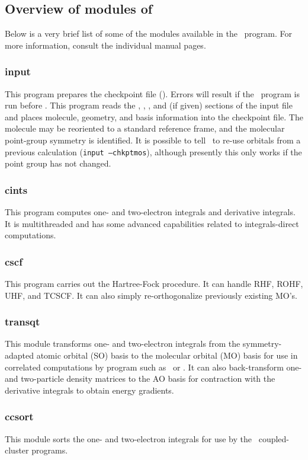 \subsection{Overview of modules of \PSIthree}
Below is a very brief list of some of the modules available in the
\PSIthree\ program.  For more information, consult the individual
manual pages.
\subsubsection{input}
This program prepares the checkpoint file (\chkptfile).  Errors will
result if the \PSIpsi\ program is run before \PSIinput.  This program
reads the , , , and (if given)
 sections of the input file and places molecule,
geometry, and basis information into the checkpoint file.  The
molecule may be reoriented to a standard reference frame, and the
molecular point-group symmetry is identified.  It is possible to tell
\PSIinput\ to re-use orbitals from a previous calculation ({\tt input
--chkptmos}), although presently this only works if the point group has
not changed.

\subsubsection{cints}
This program computes one- and two-electron integrals and derivative
integrals.  It is multithreaded and has some advanced capabilities
related to integrals-direct computations.

\subsubsection{cscf}
This program carries out the Hartree-Fock procedure.  It can handle
RHF, ROHF, UHF, and TCSCF.  It can also simply re-orthogonalize
previously existing MO's.

\subsubsection{transqt}
This module transforms one- and two-electron integrals from the
symmetry-adapted atomic orbital (SO) basis to the molecular orbital
(MO) basis for use in correlated computations by program such as
\PSIdetci\ or \PSIccenergy.  It can also back-transform one- and
two-particle density matrices to the AO basis for contraction with the
derivative integrals to obtain energy gradients.

\subsubsection{ccsort}
This module sorts the one- and two-electron integrals for use by the
\PSIthree\ coupled-cluster programs.


